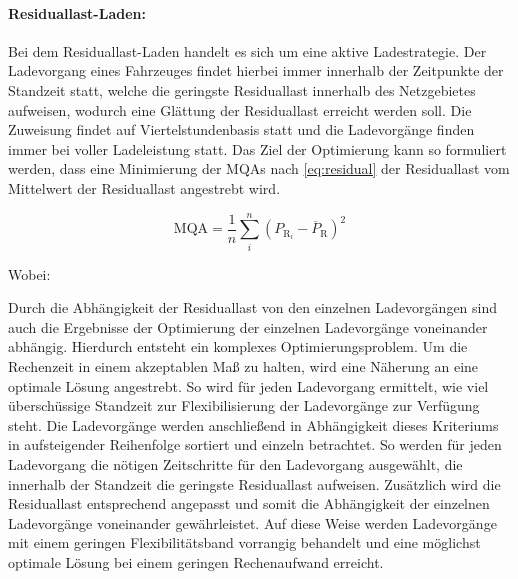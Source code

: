 

\paragraph{Residuallast-Laden:}

Bei dem Residuallast-Laden handelt es sich um eine aktive Ladestrategie.
Der Ladevorgang eines Fahrzeuges findet hierbei immer innerhalb der Zeitpunkte der Standzeit statt, welche die geringste Residuallast innerhalb des Netzgebietes aufweisen, wodurch eine Glättung der Residuallast erreicht werden soll.
Die Zuweisung findet auf Viertelstundenbasis statt und die Ladevorgänge finden immer bei voller Ladeleistung statt.
Das Ziel der Optimierung kann so formuliert werden, dass eine Minimierung der \glspl{MQA} nach \autoref{eq:residual} der Residuallast vom Mittelwert der Residuallast angestrebt wird.

\begin{equation}
	\text{MQA} = \frac{1}{n} \sum_i^n \left( P_{\text{R}_i} - \overline{P}_{\text{R}} \right)^2
	\label{eq:residual}
\end{equation}

\noindent Wobei:


Durch die Abhängigkeit der Residuallast von den einzelnen Ladevorgängen sind auch die Ergebnisse der Optimierung der einzelnen Ladevorgänge voneinander abhängig.
Hierdurch entsteht ein komplexes Optimierungsproblem.
Um die Rechenzeit in einem akzeptablen Maß zu halten, wird eine Näherung an eine optimale Lösung angestrebt.
So wird für jeden Ladevorgang ermittelt, wie viel überschüssige Standzeit zur Flexibilisierung der Ladevorgänge zur Verfügung steht.
Die Ladevorgänge werden anschließend in Abhängigkeit dieses Kriteriums in aufsteigender Reihenfolge sortiert und einzeln betrachtet.
So werden für jeden Ladevorgang die nötigen Zeitschritte für den Ladevorgang ausgewählt, die innerhalb der Standzeit die geringste Residuallast aufweisen.
Zusätzlich wird die Residuallast entsprechend angepasst und somit die Abhängigkeit der einzelnen Ladevorgänge voneinander gewährleistet.
Auf diese Weise werden Ladevorgänge mit einem geringen Flexibilitätsband vorrangig behandelt und eine möglichst optimale Lösung bei einem geringen Rechenaufwand erreicht.



